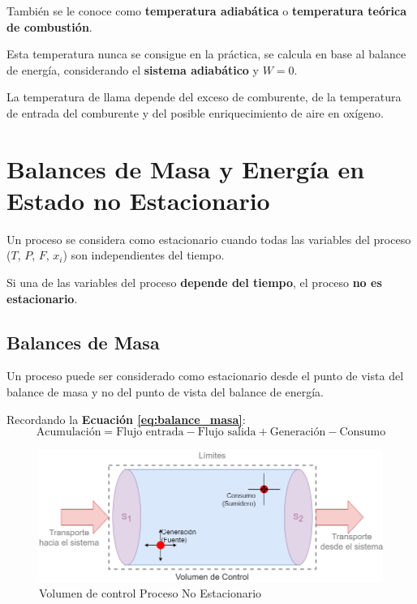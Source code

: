             También se le conoce como \textbf{temperatura adiabática} o \textbf{temperatura teórica de combustión}.
            
            Esta temperatura nunca se consigue en la práctica, se calcula en base al balance de energía, considerando el \textbf{sistema adiabático} y \(W=  0\).
            
            La temperatura de llama depende del exceso de comburente, de la temperatura de entrada del comburente y del posible enriquecimiento de aire en oxígeno.

\section{Balances de Masa y Energía en Estado no Estacionario}

Un proceso se considera como estacionario cuando todas las variables del proceso (\(T\), \(P\), \(F\), \(x_{i}\)) son independientes del tiempo.

Si una de las variables del proceso \textbf{depende del tiempo}, el proceso \textbf{no es estacionario}.

    \subsection{Balances de Masa}
    
    Un proceso puede ser considerado como estacionario desde el punto de vista del balance de masa y no del punto de vista del balance de energía.
    
    Recordando la \textbf{Ecuación \ref{eq:balance_masa}}:
    \[\text{Acumulación} = \text{Flujo entrada} - \text{Flujo salida} + \text{Generación} - \text{Consumo}\]
    
    \begin{figure}
        \centering
        \includegraphics[width=.73\textwidth]{img/esquemas/balance_masa_ns.png}
        \caption{Volumen de control Proceso No Estacionario}
        \label{fig:vol_control_n_s}
    \end{figure}
    
